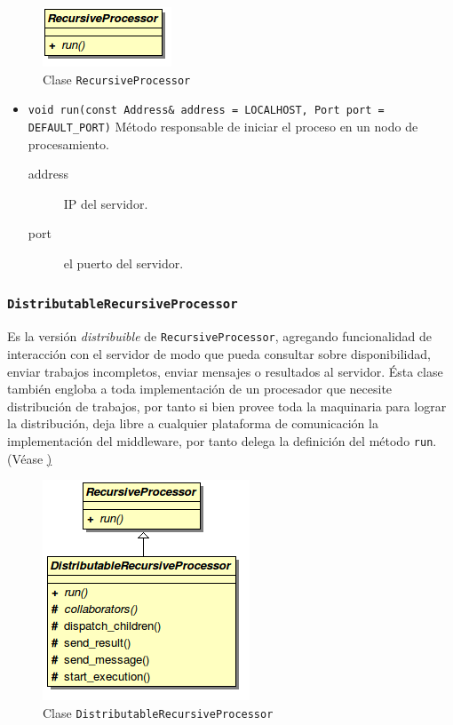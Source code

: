        \begin{figure}[ht] \hspace{4.8cm}
            \includegraphics[scale=0.75]{images/rp.png}
            \caption{Clase \texttt{RecursiveProcessor}}
            \label{rp}
        \end{figure}
        
        \begin{itemize}
            \item \texttt{void run(const Address\& address = LOCALHOST, Port port = DEFAULT\_PORT)}
                Método responsable de iniciar el proceso en un nodo de procesamiento.
                \begin{description}
                \item[address] IP del servidor.
                \item[port] el puerto del servidor.
                \end{description}
        \end{itemize}

    \subsubsection{\texttt{DistributableRecursiveProcessor}}

        Es la versión \textit{distribuible} de
        \texttt{RecursiveProcessor}, agregando funcionalidad de interacción con el servidor de modo que pueda consultar
        sobre disponibilidad, enviar trabajos incompletos, enviar mensajes o resultados al servidor.
        Ésta clase también engloba a toda implementación de un procesador que necesite distribución de trabajos, por
        tanto si bien provee toda la maquinaria para lograr la distribución, deja libre a cualquier plataforma de
        comunicación la implementación del middleware, por tanto delega la definición del método \texttt{run}. (Véase
        \href{DistributableRecursiveProcessor})

        \begin{figure}[ht] \hspace{3.8cm}
            \includegraphics[scale=0.75]{images/drp.png}
            \caption{Clase \texttt{DistributableRecursiveProcessor}}
            \label{DistributableRecursiveProcessor} 
        \end{figure}

